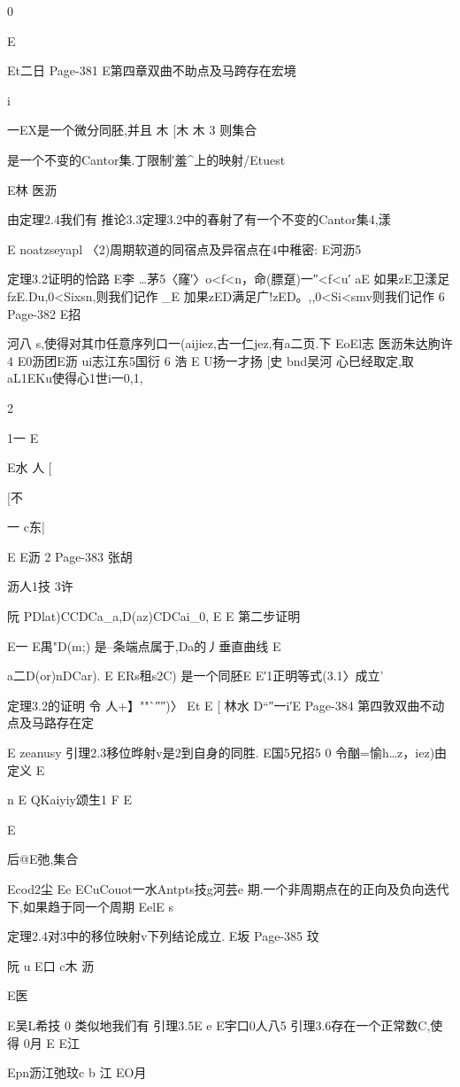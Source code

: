 {{{{{{{{{{{{{{{0

E

Et二日
Page-381
E第四章双曲不助点及马跨存在宏境

i

一EX是一个微分同胚,并且
木
[木
木
3
则集合

是一个不变的Cantor集.丁限制′羞^上的映射/Etuest

E林
医沥

由定理2.4我们有
推论3.3定理3.2中的春射了有一个不变的Cantor集4,漾

E
noatzseyapl
〈2)周期软道的同宿点及异宿点在4中稚密:
E河沥5

定理3.2证明的恰路
E李
…茅5〈窿′〉o<f<n，命(膘趸)一″<f<u′
aE
如果zE卫漾足fzE.Du,0<Sixsn,则我们记作
_E
加果zED满足广!zED。,,0<Si<smv则我们记作
6
Page-382
E招

河八
s,使得对其巾任意序列口一(aijiez,古一仁jez,有a二页.下
EoEl志
医沥朱达朐许4
E0沥团E沥
ui志江东5国衍
6
浩
E
U扬一才扬
[史
bnd吴河
心巳经取定,取aL1EKu使得心1世i一0,1,

2

1一
E

E水
人
[

[不

一
c东|

E
E沥
2
Page-383
张胡

沥人1技
3许

阮
PDlat)CCDCa_a,D(az)CDCai_0,
E
E
第二步证明

E一
E禺"D(m;)
是--条端点属于,Da的丿垂直曲线
E

a二D(or)nDCar).
E
ERs租s2C)
是一个同胚E
E′1正明等式(3.1〉成立'

定理3.2的证明
令
人+】""`″″)〉
Et
E
[
林水
D“″一i′E
Page-384
第四敦双曲不动点及马路存在定

E
zeanusy
引理2.3移位晔射v是2到自身的同胜.
E国5兄招5
0
令酗=愉h…z，iez)由定义
E

n
E
QKaiyiy颂生1
F
E

E

后@E弛,集合

Ecod2尘
Ee
ECuCouot一水Antpts技g河芸e
期.一个非周期点在的正向及负向迭代下,如果趋于同一个周期
EelE
s

定理2.4对3中的移位映射v下列结论成立.
E坂
Page-385
玟

阮
u
E口
c木
沥

E医

E吴L希技
0
类似地我们有
引理3.5E
e
E宇口0人八5
引理3.6存在一个正常数C,使得
0月
E
E江

Epn沥江弛玟c
b
江
EO月

}}}}}}}}}}}}}}}
